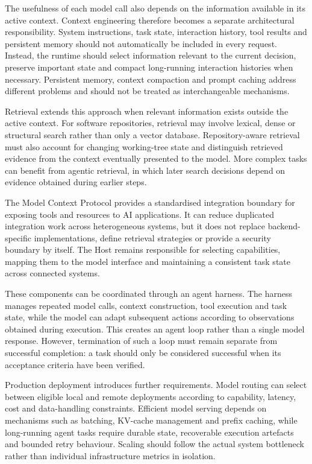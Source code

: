 The usefulness of each model call also depends on the information available in its active context. Context engineering therefore becomes a separate architectural responsibility. System instructions, task state, interaction history, tool results and persistent memory should not automatically be included in every request. Instead, the runtime should select information relevant to the current decision, preserve important state and compact long-running interaction histories when necessary. Persistent memory, context compaction and prompt caching address different problems and should not be treated as interchangeable mechanisms.

Retrieval extends this approach when relevant information exists outside the active context. For software repositories, retrieval may involve lexical, dense or structural search rather than only a vector database. Repository-aware retrieval must also account for changing working-tree state and distinguish retrieved evidence from the context eventually presented to the model. More complex tasks can benefit from agentic retrieval, in which later search decisions depend on evidence obtained during earlier steps.

The Model Context Protocol provides a standardised integration boundary for exposing tools and resources to AI applications. It can reduce duplicated integration work across heterogeneous systems, but it does not replace backend-specific implementations, define retrieval strategies or provide a security boundary by itself. The Host remains responsible for selecting capabilities, mapping them to the model interface and maintaining a consistent task state across connected systems.

These components can be coordinated through an agent harness. The harness manages repeated model calls, context construction, tool execution and task state, while the model can adapt subsequent actions according to observations obtained during execution. This creates an agent loop rather than a single model response. However, termination of such a loop must remain separate from successful completion: a task should only be considered successful when its acceptance criteria have been verified.

Production deployment introduces further requirements. Model routing can select between eligible local and remote deployments according to capability, latency, cost and data-handling constraints. Efficient model serving depends on mechanisms such as batching, KV-cache management and prefix caching, while long-running agent tasks require durable state, recoverable execution artefacts and bounded retry behaviour. Scaling should follow the actual system bottleneck rather than individual infrastructure metrics in isolation.

